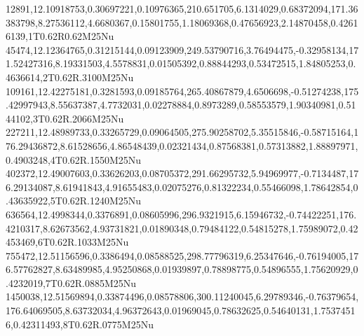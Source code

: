 12891,12.10918753,0.30697221,0.10976365,210.651705,6.1314029,0.68372094,171.36383798,8.27536112,4.6680367,0.15801755,1.18069368,0.47656923,2.14870458,0.42616139,1T0.62R0.62M25Nu
45474,12.12364765,0.31215144,0.09123909,249.53790716,3.76494475,-0.32958134,171.52427316,8.19331503,4.5578831,0.01505392,0.88844293,0.53472515,1.84805253,0.4636614,2T0.62R.3100M25Nu
109161,12.42275181,0.3281593,0.09185764,265.40867879,4.6506698,-0.51274238,175.42997943,8.55637387,4.7732031,0.02278884,0.8973289,0.58553579,1.90340981,0.5144102,3T0.62R.2066M25Nu
227211,12.48989733,0.33265729,0.09064505,275.90258702,5.35515846,-0.58715164,176.29436872,8.61528656,4.86548439,0.02321434,0.87568381,0.57313882,1.88897971,0.4903248,4T0.62R.1550M25Nu
402372,12.49007603,0.33626203,0.08705372,291.66295732,5.94969977,-0.7134487,176.29134087,8.61941843,4.91655483,0.02075276,0.81322234,0.55466098,1.78642854,0.43635922,5T0.62R.1240M25Nu
636564,12.4998344,0.3376891,0.08605996,296.9321915,6.15946732,-0.74422251,176.4210317,8.62673562,4.93731821,0.01890348,0.79484122,0.54815278,1.75989072,0.42453469,6T0.62R.1033M25Nu
755472,12.51156596,0.3386494,0.08588525,298.77796319,6.25347646,-0.76194005,176.57762827,8.63489985,4.95250868,0.01939897,0.78898775,0.54896555,1.75620929,0.4232019,7T0.62R.0885M25Nu
1450038,12.51569894,0.33874496,0.08578806,300.11240045,6.29789346,-0.76379654,176.64069505,8.63732034,4.96372643,0.01969045,0.78632625,0.54640131,1.75374516,0.42311493,8T0.62R.0775M25Nu
